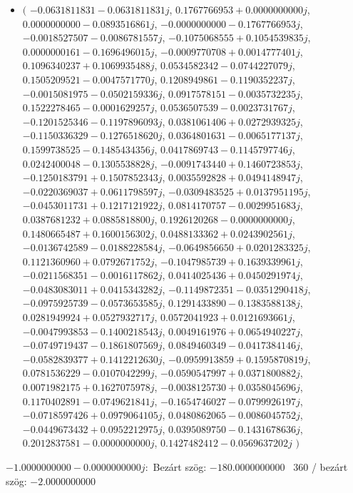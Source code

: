 \documentclass[14pt,a4paper]{article}
\begin{document}
\begin{itemize}
\item
$\big($
$-0.0631811831-0.0631811831j$, $0.1767766953+0.0000000000j$, $0.0000000000-0.0893516861j$, $-0.0000000000-0.1767766953j$, $-0.0018527507-0.0086781557j$, $-0.1075068555+0.1054539835j$, $0.0000000161-0.1696496015j$, $-0.0009770708+0.0014777401j$, $0.1096340237+0.1069935488j$, $0.0534582342-0.0744227079j$, $0.1505209521-0.0047571770j$, $0.1208949861-0.1190352237j$, $-0.0015081975-0.0502159336j$, $0.0917578151-0.0035732235j$, $0.1522278465-0.0001629257j$, $0.0536507539-0.0023731767j$, $-0.1201525346-0.1197896093j$, $0.0381061406+0.0272939325j$, $-0.1150336329-0.1276518620j$, $0.0364801631-0.0065177137j$, $0.1599738525-0.1485434356j$, $0.0417869743-0.1145797746j$, $0.0242400048-0.1305538828j$, $-0.0091743440+0.1460723853j$, $-0.1250183791+0.1507852343j$, $0.0035592828+0.0494148947j$, $-0.0220369037+0.0611798597j$, $-0.0309483525+0.0137951195j$, $-0.0453011731+0.1217121922j$, $0.0814170757-0.0029951683j$, $0.0387681232+0.0885818800j$, $0.1926120268-0.0000000000j$, $0.1480665487+0.1600156302j$, $0.0488133362+0.0243902561j$, $-0.0136742589-0.0188228584j$, $-0.0649856650+0.0201283325j$, $0.1121360960+0.0792671752j$, $-0.1047985739+0.1639339961j$, $-0.0211568351-0.0016117862j$, $0.0414025436+0.0450291974j$, $-0.0483083011+0.0415343282j$, $-0.1149872351-0.0351290418j$, $-0.0975925739-0.0573653585j$, $0.1291433890-0.1383588138j$, $0.0281949924+0.0527932717j$, $0.0572041923+0.0121693661j$, $-0.0047993853-0.1400218543j$, $0.0049161976+0.0654940227j$, $-0.0749719437-0.1861807569j$, $0.0849460349-0.0417384146j$, $-0.0582839377+0.1412212630j$, $-0.0959913859+0.1595870819j$, $0.0781536229-0.0107042299j$, $-0.0590547997+0.0371800882j$, $0.0071982175+0.1627075978j$, $-0.0038125730+0.0358045696j$, $0.1170402891-0.0749621841j$, $-0.1654746027-0.0799926197j$, $-0.0718597426+0.0979064105j$, $0.0480862065-0.0086045752j$, $-0.0449673432+0.0952212975j$, $0.0395089750-0.1431678636j$, $0.2012837581-0.0000000000j$, $0.1427482412-0.0569637202j$
$\big)$
\end{itemize}
$-1.0000000000-0.0000000000j$:\
Bezárt szög: $-180.0000000000$ \
360 / bezárt szög: $-2.0000000000$\
\end{document}
